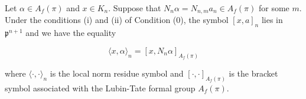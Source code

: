 Let $\alpha \in A_f(\pi)$ and $x \in K_n$. Suppose that $N_n \alpha = N_{n,m} a_n \in A_f(\pi)$ for some $m$. Under the conditions (i) and (ii) of Condition (0), the symbol $[x, a]_n$ lies in $\mathfrak{p}^{n+1}$ and we have the equality

$$
\langle x, \alpha \rangle_n = \left[ x, N_n \alpha \right]_{A_f(\pi)}
$$

where $\langle \cdot, \cdot \rangle_n$ is the local norm residue symbol and $[\cdot, \cdot]_{A_f(\pi)}$ is the bracket symbol associated with the Lubin-Tate formal group $A_f(\pi)$.
